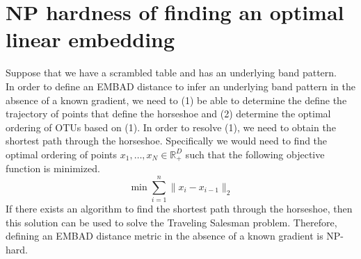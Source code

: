 \section{NP hardness of finding an optimal linear embedding}
Suppose that we have a scrambled table and has an underlying band pattern. \\[5 mm]
In order to define an EMBAD distance to infer an underlying band pattern in the absence of a known gradient, we need to (1) be able to determine the define the trajectory of points that define the horseshoe and (2) determine the optimal ordering of OTUs based on (1). In order to resolve (1), we need to obtain the shortest path through the horseshoe.  Specifically we would need to find the optimal ordering of points $x_1, \ldots ,x_N \in \mathbb{R}^D_+$ such that the following objective function is minimized.
\[ \min \sum\limits_{i=1}^n \lVert x_i - x_{i-1} \rVert_2 \]
If there exists an algorithm to find the shortest path through the horseshoe, then this solution can be used to solve the Traveling Salesman problem.  Therefore, defining an EMBAD distance metric in the absence of a known gradient is NP-hard.
